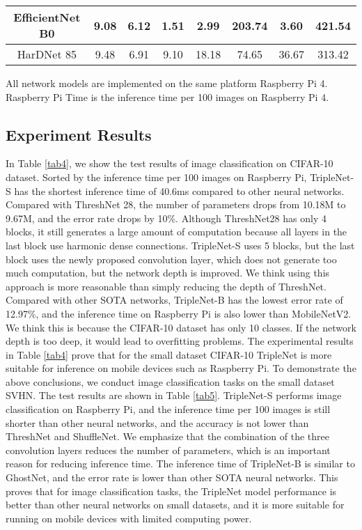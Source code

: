 \documentclass[default,iicol]{sn-jnl}
\theoremstyle{thmstyleone}\newtheorem{theorem}{Theorem}\newtheorem{proposition}[theorem]{Proposition}
\theoremstyle{thmstyletwo}\newtheorem{example}{Example}\newtheorem{remark}{Remark}
\theoremstyle{thmstylethree}\newtheorem{definition}{Definition}
\begin{document}
\begin{table*}[]
{\begin{tabular}{|c|c|c|c|c|c|c|c|}
EfficientNet B0 \cite{tan2019efficientnet} & 9.08 & 6.12 & 1.51 & 2.99 & 203.74 & 3.60 & 421.54 \\ \hline
HarDNet 85 \cite{chao2019hardnet} & 9.48 & 6.91 & 9.10 & 18.18 & 74.65 & 36.67 & 313.42 \\ \hline
\end{tabular}
}
\vspace{1mm}
\begin{tablenotes}
All network models are implemented on the same platform Raspberry Pi 4. Raspberry Pi Time is the inference time per 100 images on Raspberry Pi 4.
\end{tablenotes}
\end{table*}

\subsection{Experiment Results}
In Table \ref{tab4}, we show the test results of image classification on CIFAR-10 dataset. Sorted by the inference time per 100 images on Raspberry Pi, TripleNet-S has the shortest inference time of 40.6ms compared to other neural networks. Compared with ThreshNet 28, the number of parameters drops from 10.18M to 9.67M, and the error rate drops by 10\%. Although ThreshNet28 has only 4 blocks, it still generates a large amount of computation because all layers in the last block use harmonic dense connections. TripleNet-S uses 5 blocks, but the last block uses the newly proposed convolution layer, which does not generate too much computation, but the network depth is improved. We think using this approach is more reasonable than simply reducing the depth of ThreshNet. Compared with other SOTA networks, TripleNet-B has the lowest error rate of 12.97\%, and the inference time on Raspberry Pi is also lower than MobileNetV2. We think this is because the CIFAR-10 dataset has only 10 classes. If the network depth is too deep, it would lead to overfitting problems. The experimental results in Table \ref{tab4} prove that for the small dataset CIFAR-10 TripleNet is more suitable for inference on mobile devices such as Raspberry Pi. To demonstrate the above conclusions, we conduct image classification tasks on the small dataset SVHN. The test results are shown in Table \ref{tab5}. TripleNet-S performs image classification on Raspberry Pi, and the inference time per 100 images is still shorter than other neural networks, and the accuracy is not lower than ThreshNet and ShuffleNet. We emphasize that the combination of the three convolution layers reduces the number of parameters, which is an important reason for reducing inference time. The inference time of TripleNet-B is similar to GhostNet, and the error rate is lower than other SOTA neural networks. This proves that for image classification tasks, the TripleNet model performance is better than other neural networks on small datasets, and it is more suitable for running on mobile devices with limited computing power.
\end{document}
